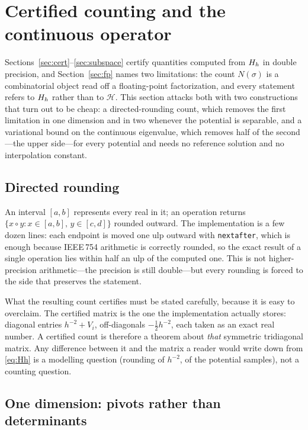 \section{Certified counting and the continuous operator}
\label{sec:certified}

Sections~\ref{sec:cert}--\ref{sec:subspace} certify quantities computed from
$H_h$ in double precision, and Section~\ref{sec:fp} names two limitations: the
count $N(\sigma)$ is a combinatorial object read off a floating-point
factorization, and every statement refers to $H_h$ rather than to
$\mathcal H$. This section attacks both with two constructions that turn out
to be cheap: a directed-rounding count, which removes the first limitation in
one dimension and in two whenever the potential is separable, and a
variational bound on the continuous eigenvalue, which removes half of the
second---the upper side---for every potential and needs no reference solution
and no interpolation constant.

\subsection{Directed rounding}

An interval $[a,b]$ represents every real in it; an operation returns
$\{x\circ y : x\in[a,b],\,y\in[c,d]\}$ rounded outward. The implementation is
a few dozen lines: each endpoint is moved one ulp outward with
\texttt{nextafter}, which is enough because IEEE\,754 arithmetic is correctly
rounded, so the exact result of a single operation lies within half an ulp of
the computed one. This is not higher-precision arithmetic---the precision is
still double---but every rounding is forced to the side that preserves the
statement.

What the resulting count certifies must be stated carefully, because it is
easy to overclaim. The certified matrix is the one the implementation actually
stores: diagonal entries $h^{-2}+V_i$, off-diagonals $-\tfrac12h^{-2}$, each
taken as an exact real number. A certified count is therefore a theorem about
\emph{that} symmetric tridiagonal matrix. Any difference between it and the
matrix a reader would write down from \eqref{eq:Hh} is a modelling question
(rounding of $h^{-2}$, of the potential samples), not a counting question.

\subsection{One dimension: pivots rather than determinants}

